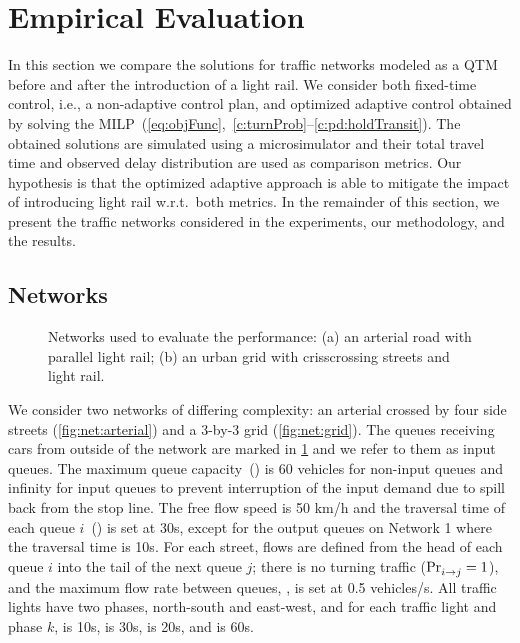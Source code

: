 \section{Empirical Evaluation}
  
In this section we compare the solutions for traffic networks modeled as a QTM
before and after the introduction of a light rail.
%
We consider both fixed-time control, i.e., a non-adaptive control plan, and
optimized adaptive control obtained by solving the
MILP~(\ref{eq:objFunc},~\ref{c:turnProb}--\ref{c:pd:holdTransit}).
%
The obtained solutions are simulated using a microsimulator and their total
travel time and observed delay distribution are used as comparison metrics.
%
Our hypothesis is that the optimized adaptive approach is able to mitigate the
impact of introducing light rail w.r.t.\ both metrics.
%
In the remainder of this section, we present the traffic networks considered in
the experiments, our methodology, and the results.






\subsection{Networks}

\begin{figure}[t!]
\centering
\caption{Networks used to evaluate the performance:
  (a) an arterial road with parallel light rail;
  (b) an urban grid with crisscrossing streets and light rail.
%
}
\label{fig:networks}
\end{figure}


We consider two networks of differing complexity: an arterial crossed by four
side streets (\cref{fig:net:arterial}) and a 3-by-3 grid (\cref{fig:net:grid}).
%
The queues receiving cars from outside of the network are
marked in \cref{fig:networks} and we refer to them as input queues.
%
The maximum queue capacity~() is 60 vehicles for non-input queues and
infinity for input queues to prevent interruption of the input demand due to
spill back from the stop line. 
%
The free flow speed is 50 km/h and the traversal time of each queue $i$~() is set at 30s,
except for the output queues on Network 1 where the traversal
time is 10s.
%
For each street, flows are defined from the head of each queue $i$ into the tail
of the next queue $j$;
%
there is no turning traffic ($\mathrm{Pr}_{i\to j}^{\mathrm{}}=1$), and the maximum flow rate
between queues, , is set at 0.5 vehicles/s.
%
All traffic lights have two phases, north-south and east-west, and for each
traffic light \tl and phase $k$,  is 10s,  is 30s,
\CTMIN{\tl} is 20s, and \CTMAX{\tl} is 60s.



